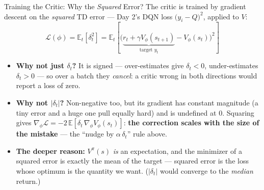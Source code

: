 \begin{frame}{Training the Critic: Why the \emph{Squared} Error?}
The critic is trained by gradient descent on the \emph{squared} TD error --- Day 2's DQN loss $\big(y_i - Q\big)^2$, applied to $V$:
$$\mathcal{L}(\phi) = \mathbb{E}_t\!\left[\delta_t^2\right] = \mathbb{E}_t\!\left[\bigl(\underbrace{r_t + \gamma V_\phi(s_{t+1})}_{\text{target } y_t} - V_\phi(s_t)\bigr)^2\right]$$
\begin{itemize}
    \item \textbf{Why not just $\delta_t$?} It is signed --- over-estimates give $\delta_t < 0$, under-estimates $\delta_t > 0$ --- so over a batch they \emph{cancel}: a critic wrong in both directions would report a loss of zero.
    \pause
    \item \textbf{Why not $|\delta_t|$?} Non-negative too, but its gradient has constant magnitude (a tiny error and a huge one pull equally hard) and is undefined at $0$. Squaring gives $\nabla_\phi \mathcal{L} = -2\,\mathbb{E}[\delta_t\, \nabla_\phi V_\phi(s_t)]$: \textbf{the correction scales with the size of the mistake} --- the ``nudge by $\alpha\,\delta_t$'' rule above.
    \pause
    \item \textbf{The deeper reason:} $V^{\pi}(s)$ \emph{is} an expectation, and the minimizer of a squared error is exactly the mean of the target --- squared error is the loss whose optimum is the quantity we want. ($|\delta_t|$ would converge to the \emph{median} return.)
\end{itemize}
\end{frame}
